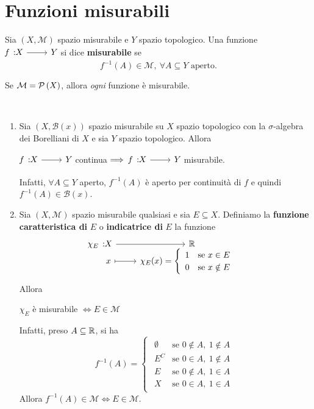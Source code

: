 \section{Funzioni misurabili}
\begin{define}
	Sia $\left(X, \mathcal{M}\right)$ spazio misurabile e $Y$ spazio topologico. Una funzione $\funz{f}{X}{Y}$ si dice \textbf{misurabile} se \begin{equation}
		f^{-1}\left(A\right)\in\mathcal{M},\ \forall A\subseteq Y\text{ aperto.}
	\end{equation}
\end{define}
\begin{observe}
	Se $\mathcal{M}=\mathcal{P}\left(X\right)$, allora \textit{ogni} funzione è misurabile.
\end{observe}
\begin{examples}~{}
	\begin{enumerate}
		\item Sia $\left(X,\mathcal{B}(x)\right)$ spazio misurabile su $X$ spazio topologico con la $\sigma$-algebra dei Borelliani di $X$ e sia $Y$ spazio topologico. Allora
		\begin{center}
			$\funz{f}{X}{Y}$ continua$\implies \funz{f}{X}{Y}$ misurabile.
		\end{center}
	Infatti, $\forall A\subseteq Y$ aperto, $f^{-1}\left(A\right)$ è aperto per continuità di $f$ e quindi $f^{-1}\left(A\right)\in\mathcal{B}(x)$.
	\item Sia $\left(X,\mathcal{M}\right)$ spazio misurabile qualsiasi e sia $E\subseteq X$. Definiamo la \textbf{funzione caratteristica di} $E$ o \textbf{indicatrice di} $E$ la funzione
	\begin{equation}
		\funztot{\chi_E}{X}{\realset}{x}{\chi_E(x)=\begin{cases}
				\begin{array}{ll}
					1&\text{se }x\in E\\
					0&\text{se }x\notin E\\
				\end{array}
		\end{cases}}
	\end{equation}
Allora
\begin{center}
$\chi_E$ è misurabile $\iff E\in\mathcal{M}$
\end{center}
Infatti, preso $A\subseteq \mathbb{R}$, si ha
\begin{equation*}
f^{-1}\left(A\right)=\begin{cases}
	\begin{array}{ll}
		\emptyset&\text{se }0\notin A,\ 1\notin A\\
		E^C&\text{se }0\in A,\ 1\notin A\\
		E&\text{se }0\notin A,\ 1\in A\\
		X&\text{se }0\in A,\ 1\in A
	\end{array}
\end{cases}
\end{equation*}
Allora $f^{-1}\left(A\right)\in\mathcal{M}\iff E\in\mathcal{M}$.
\end{enumerate}
\end{examples}
